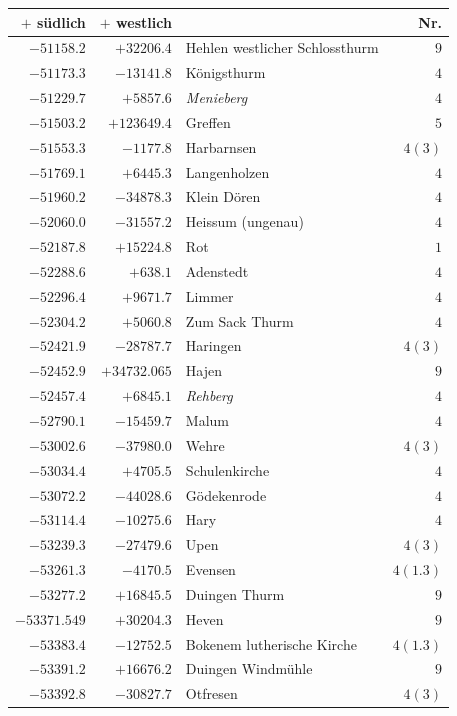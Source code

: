 \begin{center}\begingroup\fontsize{8}{9}\selectfont
\setlength{\tabcolsep}{4pt}
\begin{tabular}{r|r|p{170pt}|r}\hline
\(+\) südlich&\(+\) westlich&&Nr.\\\hline
\(-51158.2\)&\(+32206.4\)&Hehlen westlicher Schlossthurm&\(9\)\\
\(-51173.3\)&\(-13141.8\)&Königsthurm&\(4\)\\
\(-51229.7\)&\(+5857.6\)&\textit{Menieberg}&\(4\)\\
\(-51503.2\)&\(+123649.4\)&Greffen&\(5\)\\
\(-51553.3\)&\(-1177.8\)&Harbarnsen&\(4(3)\)\\
\(-51769.1\)&\(+6445.3\)&Langenholzen&\(4\)\\
\(-51960.2\)&\(-34878.3\)&Klein Dören&\(4\)\\
\(-52060.0\)&\(-31557.2\)&Heissum (ungenau)&\(4\)\\
\(-52187.8\)&\(+15224.8\)&Rot&\(1\)\\
\(-52288.6\)&\(+638.1\)&Adenstedt&\(4\)\\
\(-52296.4\)&\(+9671.7\)&Limmer&\(4\)\\
\(-52304.2\)&\(+5060.8\)&Zum Sack Thurm&\(4\)\\
\(-52421.9\)&\(-28787.7\)&Haringen&\(4(3)\)\\
\(-52452.9\)&\(+34732.065\)&Hajen&\(9\)\\
\(-52457.4\)&\(+6845.1\)&\textit{Rehberg}&\(4\)\\
\(-52790.1\)&\(-15459.7\)&Malum&\(4\)\\
\(-53002.6\)&\(-37980.0\)&Wehre&\(4(3)\)\\
\(-53034.4\)&\(+4705.5\)&Schulenkirche&\(4\)\\
\(-53072.2\)&\(-44028.6\)&Gödekenrode&\(4\)\\
\(-53114.4\)&\(-10275.6\)&Hary&\(4\)\\
\(-53239.3\)&\(-27479.6\)&Upen&\(4(3)\)\\
\(-53261.3\)&\(-4170.5\)&Evensen&\(4(1.3)\)\\
\(-53277.2\)&\(+16845.5\)&Duingen Thurm&\(9\)\\
\(-53371.549\)&\(+30204.3\)&Heven&\(9\)\\
\(-53383.4\)&\(-12752.5\)&Bokenem lutherische Kirche&\(4(1.3)\)\\
\(-53391.2\)&\(+16676.2\)&Duingen Windmühle&\(9\)\\
\(-53392.8\)&\(-30827.7\)&Otfresen&\(4(3)\)\\

\end{tabular}
\end{center}
